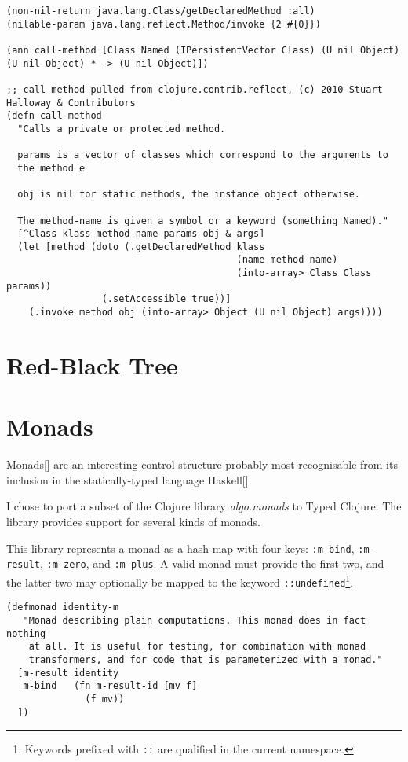 \begin{lstlisting}
(non-nil-return java.lang.Class/getDeclaredMethod :all)
(nilable-param java.lang.reflect.Method/invoke {2 #{0}})

(ann call-method [Class Named (IPersistentVector Class) (U nil Object) (U nil Object) * -> (U nil Object)])

;; call-method pulled from clojure.contrib.reflect, (c) 2010 Stuart Halloway & Contributors
(defn call-method
  "Calls a private or protected method.

  params is a vector of classes which correspond to the arguments to
  the method e

  obj is nil for static methods, the instance object otherwise.

  The method-name is given a symbol or a keyword (something Named)."
  [^Class klass method-name params obj & args]
  (let [method (doto (.getDeclaredMethod klass 
                                         (name method-name)
                                         (into-array> Class Class params))
                 (.setAccessible true))]
    (.invoke method obj (into-array> Object (U nil Object) args))))
\end{lstlisting}

\section{Red-Black Tree}

\section{Monads}

Monads[] are an interesting control structure probably most recognisable from its inclusion
in the statically-typed language Haskell[].

I chose to port a subset of the Clojure library \emph{algo.monads} to Typed Clojure. The library
provides support for several kinds of monads.

This library represents a monad as a hash-map with four keys: \lstinline|:m-bind|, \lstinline|:m-result|,
\lstinline|:m-zero|, and \lstinline|:m-plus|. A valid monad must provide the first two, and the latter
two may optionally be mapped to the keyword \lstinline|::undefined|\footnote{Keywords prefixed with \lstinline|::|
are qualified in the current namespace.}.

\begin{lstlisting}[caption=Untyped definition for the identity monad, label=lst:identitymdef]
(defmonad identity-m
   "Monad describing plain computations. This monad does in fact nothing
    at all. It is useful for testing, for combination with monad
    transformers, and for code that is parameterized with a monad."
  [m-result identity
   m-bind   (fn m-result-id [mv f]
              (f mv))
  ])
\end{lstlisting}

